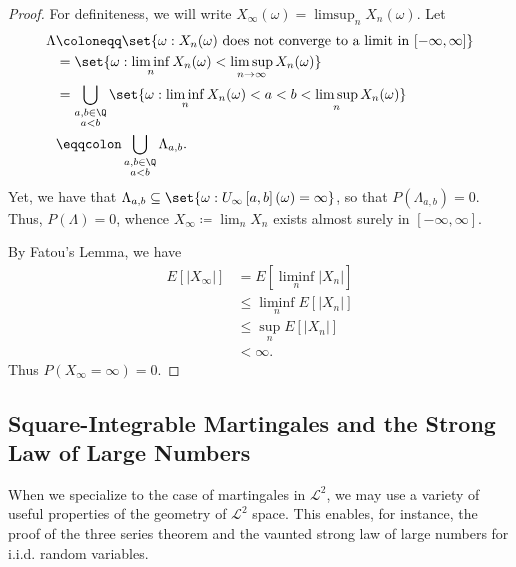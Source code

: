 \documentclass[10pt]{mypackage}
\renewcommand{\coloneq}{\coloneqq}
\renewcommand{\eqcolon}{\eqqcolon}
\begin{document}
\begin{proof}
  For definiteness, we will write $X_{\infty}(\omega) = \limsup_{n}X_{n}(\omega)$. Let
  \begin{align*}
    \Lambda &\coloneq \set{\omega : X_n(\omega)\text{ does not converge to a limit in }[-\infty,\infty]}\\
            &= \set{\omega : \liminf_{n}X_n(\omega) < \limsup_{n\to\infty}X_n(\omega)}\\
            &= \bigcup_{\substack{a,b\in \Q\\a < b}} \set{\omega : \liminf_{n}X_n(\omega) < a < b < \limsup_{n}X_n(\omega)}\\
            &\eqcolon \bigcup_{\substack{a,b\in \Q\\a < b}} \Lambda_{a,b}.
  \end{align*}
  Yet, we have that $\Lambda_{a,b}\subseteq \set{\omega : U_{\infty}\left[ a,b \right](\omega) = \infty}$, so that $P\left( \Lambda_{a,b} \right) = 0$. Thus, $P\left( \Lambda \right) = 0$, whence $X_{\infty} \coloneq \lim_{n}X_n$ exists almost surely in $[-\infty,\infty]$.

  By Fatou's Lemma, we have
  \begin{align*}
    E\left[ \left\vert X_{\infty} \right\vert \right] &= E\left[ \liminf_{n}\left\vert X_n \right\vert \right]\\
                                                      &\leq \liminf_{n} E\left[ \left\vert X_n \right\vert \right]\\
                                                      &\leq \sup_{n} E\left[ \left\vert X_n \right\vert \right]\\
                                                      &< \infty.
  \end{align*}
  Thus $P\left( X_{\infty} = \infty \right) = 0$.
\end{proof}
\subsection{Square-Integrable Martingales and the Strong Law of Large Numbers}%
When we specialize to the case of martingales in $\mathcal{L}^2$, we may use a variety of useful properties of the geometry of $\mathcal{L}^2$ space. This enables, for instance, the proof of the three series theorem and the vaunted strong law of large numbers for i.i.d. random variables.
\end{document}
